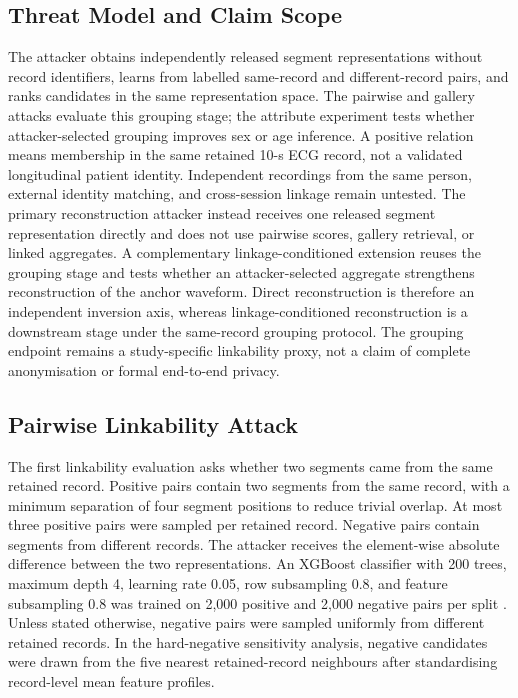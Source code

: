 \documentclass[journal]{IEEEtran}
\begin{document}
\subsection{Threat Model and Claim Scope}
\label{subsec:threat-model}

The attacker obtains independently released segment representations without
record identifiers, learns from labelled same-record and different-record
pairs, and ranks candidates in the same representation space. The pairwise
and gallery attacks evaluate this grouping stage; the attribute experiment
tests whether attacker-selected grouping improves sex or age inference. A
positive relation means membership in the same retained 10-s ECG record, not
a validated longitudinal patient identity. Independent recordings from the
same person, external identity matching, and cross-session linkage remain
untested. The primary reconstruction attacker instead receives one released
segment representation directly and does not use pairwise scores, gallery
retrieval, or linked aggregates. A complementary linkage-conditioned
extension reuses the grouping stage and tests whether an attacker-selected aggregate strengthens
reconstruction of the anchor waveform. Direct reconstruction is therefore an
independent inversion axis, whereas linkage-conditioned reconstruction is a
downstream stage under the same-record grouping protocol. The grouping endpoint
remains a
study-specific linkability proxy, not a claim of complete anonymisation or
formal end-to-end privacy.

\subsection{Pairwise Linkability Attack}
\label{subsec:pairwise}

The first linkability evaluation asks whether two segments came from the
same retained record. Positive pairs contain two segments from the same record,
with a minimum separation of four segment positions to reduce trivial overlap.
At most three positive pairs were sampled per retained record. Negative pairs
contain segments from different records. The attacker receives the
element-wise absolute difference between the two representations. An XGBoost
classifier with 200 trees, maximum depth 4, learning rate 0.05, row
subsampling 0.8, and feature subsampling 0.8 was trained on 2,000 positive and
2,000 negative pairs per split \cite{ChenGuestrin2016XGBoost}. Unless stated
otherwise, negative pairs were sampled uniformly from different retained
records. In the hard-negative sensitivity analysis, negative candidates were
drawn from the five nearest retained-record neighbours after standardising
record-level mean feature profiles.
\end{document}
